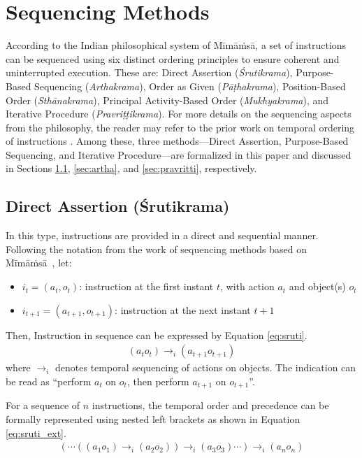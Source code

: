 \documentclass[a4paper,11pt]{lmcs}
\newcommand{\mimamsa}{M\={i}m\={a}\.ms\={a}}
\begin{document}
\section{Sequencing Methods}
\label{sec:seq}
According to the Indian philosophical system of \mimamsa, a set of instructions can be sequenced using six distinct ordering principles to ensure coherent and uninterrupted execution. These are: Direct Assertion (\textit{Śrutikrama}), Purpose-Based Sequencing (\textit{Arthakrama}), Order as Given (\textit{P\={a}\d{t}hakrama}), Position-Based Order (\textit{Sth\={a}nakrama}), Principal Activity-Based Order (\textit{Mukhyakrama}), and Iterative Procedure (\textit{Pravri\d{t}\d{t}ikrama}). For more details on the sequencing aspects from the philosophy, the reader may refer to the prior work on temporal ordering of instructions \cite{llm_mira}. Among these, three methods—Direct Assertion, Purpose-Based Sequencing, and Iterative Procedure—are formalized in this paper and discussed in Sections \ref{sec:sruti}, \ref{sec:artha}, and \ref{sec:pravritti}, respectively.


\subsection{Direct Assertion (\'{S}rutikrama)}
\label{sec:sruti}
In this type, instructions are provided in a direct and sequential manner. Following the notation from the work of sequencing methods based on \mimamsa~\cite{llm_mira}, let:
\begin{itemize}
 \item $i_t = (a_t,o_t)$: instruction at the first instant $t$, with action $a_t$ and object(s) $o_t$
\item $i_{t+1} = (a_{t+1},o_{t+1})$: instruction at the next instant $t+1$
 \end{itemize}
Then, Instruction in sequence can be expressed by Equation \ref{eq:sruti}.
\begin{eqnarray}
\label{eq:sruti}
 (a_t o_t) \rightarrow_i (a_{t+1}o_{t+1})
\end{eqnarray}
where $\rightarrow_i$ denotes temporal sequencing of actions on objects. The indication can be read as  ``perform $a_t$ on $o_t$, then perform $a_{t+1}$ on $o_{t+1}$''.

For a sequence of $n$ instructions, the temporal order and precedence can be formally represented using nested left brackets as shown in Equation \ref{eq:sruti_ext}.
\begin{eqnarray}
 \label{eq:sruti_ext}
(\cdots ((a_1 o_1) \rightarrow_i (a_2 o_2)) \rightarrow_i (a_3 o_3) \cdots ) \rightarrow_i (a_n o_n)
\end{eqnarray}
\end{document}
